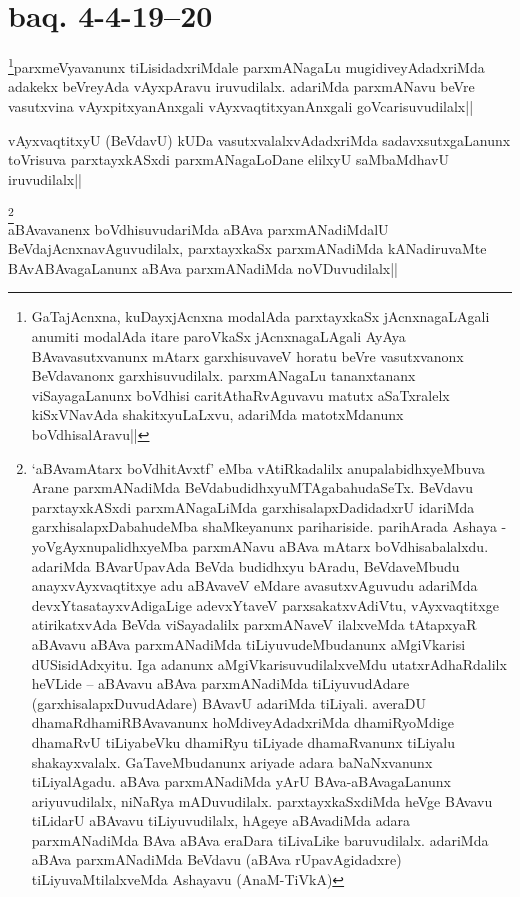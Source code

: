 
\section*{baq. 4-4-19--20}

\begin{artha}
\footnote[1]{GaTajAcnxna, kuDayxjAcnxna modalAda parxtayxkaSx 
jAcnxnagaLAgali anumiti modalAda itare paroVkaSx jAcnxnagaLAgali AyAya 
BAvavasutxvanunx mAtarx garxhisuvaveV horatu beVre vasutxvanonx 
BeVdavanonx garxhisuvudilalx. parxmANagaLu tananxtananx viSayagaLanunx 
boVdhisi caritAthaRvAguvavu matutx aSaTxralelx kiSxVNavAda 
shakitxyuLaLxvu, adariMda matotxMdanunx boVdhisalAravu||}parxmeVyavanunx tiLisidadxriMdale parxmANagaLu mugidiveyAdadxriMda 
adakekx beVreyAda vAyxpAravu iruvudilalx. adariMda parxmANavu beVre 
vasutxvina vAyxpitxyanAnxgali vAyxvaqtitxyanAnxgali goVcarisuvudilalx||
\end{artha}

\begin{artha}
vAyxvaqtitxyU (BeVdavU) kUDa vasutxvalalxvAdadxriMda 
sadavxsutxgaLanunx toVrisuva parxtayxkASxdi parxmANagaLoDane elilxyU 
saMbaMdhavU iruvudilalx||
\end{artha}

\begin{artha} 
\footnote[2]{`aBAvamAtarx boVdhitAvxtf' eMba vAtiRkadalilx 
anupalabidhxyeMbuva Arane parxmANadiMda BeVdabudidhxyuMTAgabahudaSeTx. 
BeVdavu parxtayxkASxdi parxmANagaLiMda garxhisalapxDadidadxrU idariMda 
garxhisalapxDabahudeMba shaMkeyanunx parihariside. parihArada Ashaya - 
yoVgAyxnupalidhxyeMba parxmANavu aBAva mAtarx boVdhisabalalxdu. 
adariMda BAvarUpavAda BeVda budidhxyu bAradu, BeVdaveMbudu 
anayxvAyxvaqtitxye adu aBAvaveV eMdare avasutxvAguvudu adariMda 
devxYtasatayxvAdigaLige adevxYtaveV parxsakatxvAdiVtu, vAyxvaqtitxge 
atirikatxvAda BeVda viSayadalilx parxmANaveV ilalxveMda tAtapxyaR 
aBAvavu aBAva parxmANadiMda tiLiyuvudeMbudanunx aMgiVkarisi 
dUSisidAdxyitu. Iga adanunx aMgiVkarisuvudilalxveMdu utatxrAdhaRdalilx 
heVLide -- aBAvavu aBAva parxmANadiMda tiLiyuvudAdare 
(garxhisalapxDuvudAdare) BAvavU adariMda tiLiyali. averaDU 
dhamaRdhamiRBAvavanunx hoMdiveyAdadxriMda dhamiRyoMdige dhamaRvU 
tiLiyabeVku dhamiRyu tiLiyade dhamaRvanunx tiLiyalu shakayxvalalx. 
GaTaveMbudanunx ariyade adara baNaNxvanunx tiLiyalAgadu. aBAva 
parxmANadiMda yArU BAva-aBAvagaLanunx ariyuvudilalx, niNaRya 
mADuvudilalx. parxtayxkaSxdiMda heVge BAvavu tiLidarU aBAvavu 
tiLiyuvudilalx, hAgeye aBAvadiMda adara parxmANadiMda BAva aBAva 
eraDara tiLivaLike baruvudilalx. adariMda aBAva parxmANadiMda BeVdavu 
(aBAva rUpavAgidadxre) tiLiyuvaMtilalxveMda Ashayavu (AnaM-TiVkA)}\\
aBAvavanenx boVdhisuvudariMda aBAva parxmANadiMdalU 
BeVdajAcnxnavAguvudilalx, parxtayxkaSx parxmANadiMda kANadiruvaMte 
BAvABAvagaLanunx aBAva parxmANadiMda noVDuvudilalx||
\end{artha}

